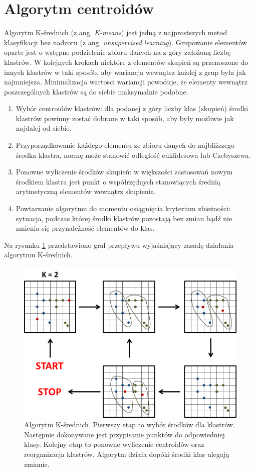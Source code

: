 \section{Algorytm centroidów}
Algorytm K-średnich (z ang. \textit{K-means}) jest jedną z najprostszych metod klasyfikacji bez nadzoru (z ang. \textit{unsupervised learning}). Grupowanie elementów oparte jest o wstępne podzielenie zbioru danych na z góry założoną liczbę klastrów. W kolejnych krokach niektóre z elementów skupień są przenoszone do innych klastrów w taki sposób, aby wariancja wewnątrz każdej z grup była jak najmniejsza. Minimalizacja wartosci wariancji powoduje, że elementy wewnątrz poszczególnych klastrów są do siebie maksymalnie podobne. 

\begin{enumerate}
	\item Wybór centroidów klastrów: dla podanej z góry liczby klas (skupień)  środki klastrów powinny zostać dobrane w taki sposób, aby były możliwie jak najdalej od siebie.
	\item Przyporządkowanie każdego elementu ze zbioru danych do najbliższego środka klastra, normę może stanowić odległość euklidesowa lub Czebyszewa.
	\item Ponowne wyliczenie środków skupień: w większości zastosowań nowym środkiem klastra jest punkt o współrzędnych stanowiących średnią arytmetyczną elementów wewnątrz skupienia.
	\item Powtarzanie algorytmu do momentu osiągnięcia kryterium zbieżności: sytuacja, podczas której środki klastrów pozostają bez zmian bądź nie zmienia się przynależność elementów do klas.
\end{enumerate}

Na rysunku \ref{im: Clustering} przedstawiono graf przepływu wyjaśniający zasadę działania algorytmu K-średnich.
\begin{figure}[h]
	\includegraphics[width=16cm]{Clustering1}
	\centering
	\caption{Algorytm K-średnich. Pierwszy etap to wybór środków dla klastrów. Następnie dokonywane jest przypisanie punktów do odpowiedniej klasy. Kolejny etap to ponowne wyliczenie centroidów oraz reorganizacja klastrów. Algorytm działa dopóki środki klas ulegają zmianie.}
	\label{im: Clustering}
\end{figure}


